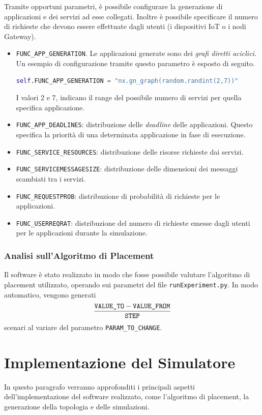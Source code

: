 Tramite opportuni parametri, è possibile configurare la generazione di applicazioni e dei servizi ad esse collegati. Inoltre è possibile specificare il numero di richieste che devono essere effettuate dagli utenti (i dispositivi IoT o i nodi Gateway). 
\begin{itemize}
	\item \texttt{FUNC\_APP\_GENERATION}. Le applicazioni generate sono dei \textit{grafi diretti aciclici}. Un esempio di configurazione tramite questo parametro è esposto di seguito.
		\begin{lstlisting}[language=python]
self.FUNC_APP_GENERATION = "nx.gn_graph(random.randint(2,7))"\end{lstlisting}
		I valori 2 e 7, indicano il range del possibile numero di servizi per quella specifica applicazione.
	\item \texttt{FUNC\_APP\_DEADLINES}: distribuzione delle \textit{deadline} delle applicazioni. Questo specifica la priorità di una determinata applicazione in fase di esecuzione.
	\item \texttt{FUNC\_SERVICE\_RESOURCES}: distribuzione delle risorse richieste dai servizi.
	\item \texttt{FUNC\_SERVICEMESSAGESIZE}: distribuzione delle dimensioni dei messaggi scambiati tra i servizi.
	\item \texttt{FUNC\_REQUESTPROB}: distribuzione di probabilità di richieste per le applicazioni.
	\item \texttt{FUNC\_USERREQRAT}: distribuzione del numero di richieste emesse dagli utenti per le applicazioni durante la simulazione.
\end{itemize}

\subsubsection{Analisi sull'Algoritmo di Placement}
Il software è stato realizzato in modo che fosse possibile valutare l'algoritmo di placement utilizzato, operando sui parametri del file \texttt{runExperiment.py}. In modo automatico, vengono generati 
		$$\frac{\text{\texttt{VALUE\_TO}} - \text{\texttt{VALUE\_FROM}}}{\text{\texttt{STEP}}}$$
scenari al variare del parametro \texttt{PARAM\_TO\_CHANGE}.

\section{Implementazione del Simulatore}

In questo paragrafo verranno approfonditi i principali aspetti dell'implementazione del software realizzato, come l'algoritmo di placement, la generazione della topologia e delle simulazioni.

